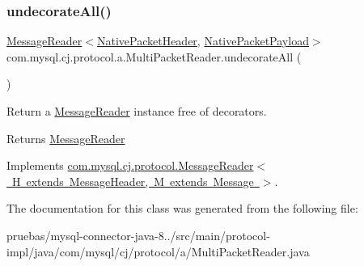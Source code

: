 \subsubsection{\texorpdfstring{undecorate\+All()}{undecorateAll()}}
{\footnotesize\ttfamily \mbox{\hyperlink{interfacecom_1_1mysql_1_1cj_1_1protocol_1_1_message_reader}{Message\+Reader}}$<$\mbox{\hyperlink{classcom_1_1mysql_1_1cj_1_1protocol_1_1a_1_1_native_packet_header}{Native\+Packet\+Header}}, \mbox{\hyperlink{classcom_1_1mysql_1_1cj_1_1protocol_1_1a_1_1_native_packet_payload}{Native\+Packet\+Payload}}$>$ com.\+mysql.\+cj.\+protocol.\+a.\+Multi\+Packet\+Reader.\+undecorate\+All (\begin{DoxyParamCaption}{ }\end{DoxyParamCaption})}

Return a \mbox{\hyperlink{interfacecom_1_1mysql_1_1cj_1_1protocol_1_1_message_reader}{Message\+Reader}} instance free of decorators.

\begin{DoxyReturn}{Returns}
\mbox{\hyperlink{interfacecom_1_1mysql_1_1cj_1_1protocol_1_1_message_reader}{Message\+Reader}} 
\end{DoxyReturn}


Implements \mbox{\hyperlink{interfacecom_1_1mysql_1_1cj_1_1protocol_1_1_message_reader_a22a326215a91e4d7bff08d1f2c3e1b6d}{com.\+mysql.\+cj.\+protocol.\+Message\+Reader$<$ H extends Message\+Header, M extends Message $>$}}.



The documentation for this class was generated from the following file\+:\begin{DoxyCompactItemize}
\item 
pruebas/mysql-\/connector-\/java-\/8../src/main/protocol-\/impl/java/com/mysql/cj/protocol/a/Multi\+Packet\+Reader.\+java\end{DoxyCompactItemize}
